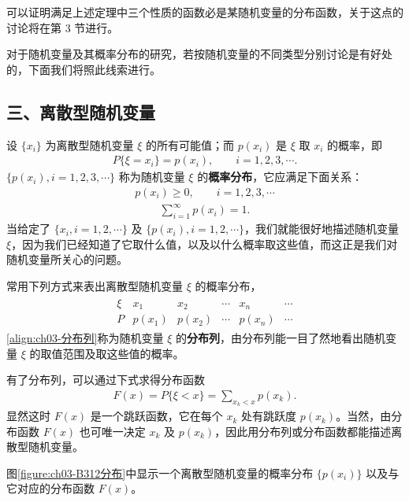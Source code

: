 \documentclass[../../main.tex]{subfiles}
\begin{document}
可以证明满足上述定理中三个性质的函数必是某随机变量的分布函数，关于这点的讨论将在第 $3$ 节进行。

对于随机变量及其概率分布的研究，若按随机变量的不同类型分别讨论是有好处的，下面我们将照此线索进行。

\subsection*{三、离散型随机变量}

设 $\{x_i\}$ 为离散型随机变量 $\xi$ 的所有可能值；而 $p(x_i)$ 是 $\xi$ 取 $x_i$ 的概率，即
\begin{align}
P\{\xi=x_i\}=p(x_i),\qquad i=1,2,3,\cdots.\label{align:ch03-离散概率}
\end{align}
$\{p(x_i),i=1,2,3,\cdots\}$ 称为随机变量 $\xi$ 的\textbf{概率分布}，它应满足下面关系：
\begin{align}
p(x_i)\geqslant 0,\qquad i=1,2,3,\cdots\label{align:ch03-非负性}
\end{align}
\begin{align}
\sum_{i=1}^{\infty}p(x_i)=1.\label{align:ch03-归一性}
\end{align}
当给定了 $\{x_i,i=1,2,\cdots\}$ 及 $\{p(x_i),i=1,2,\cdots\}$，我们就能很好地描述随机变量 $\xi$，因为我们已经知道了它取什么值，以及以什么概率取这些值，而这正是我们对随机变量所关心的问题。

常用下列方式来表出离散型随机变量 $\xi$ 的概率分布，
\begin{align}
\begin{array}{c|cccccc}
\xi & x_1 & x_2 & \cdots & x_n & \cdots\\
\hline
P & p(x_1) & p(x_2) & \cdots & p(x_n) & \cdots
\end{array}\label{align:ch03-分布列}
\end{align}
\eqref{align:ch03-分布列}称为随机变量 $\xi$ 的\textbf{分布列}，由分布列能一目了然地看出随机变量 $\xi$ 的取值范围及取这些值的概率。

有了分布列，可以通过下式求得分布函数
\begin{align}
F(x)=P\{\xi<x\}=\sum_{x_k<x}p(x_k).\label{align:ch03-离散分布函数}
\end{align}
显然这时 $F(x)$ 是一个跳跃函数，它在每个 $x_k$ 处有跳跃度 $p(x_k)$。当然，由分布函数 $F(x)$ 也可唯一决定 $x_k$ 及 $p(x_k)$，因此用分布列或分布函数都能描述离散型随机变量。

图\ref{figure:ch03-B312分布}中显示一个离散型随机变量的概率分布 $\{p(x_i)\}$ 以及与它对应的分布函数 $F(x)$。
\end{document}

